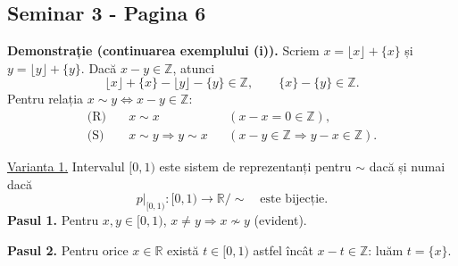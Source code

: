 
\subsection*{Seminar 3 - Pagina 6}
\begingroup
\setlength{\abovedisplayskip}{5pt}
\setlength{\belowdisplayskip}{5pt}
\setlength{\abovedisplayshortskip}{3pt}
\setlength{\belowdisplayshortskip}{3pt}

\noindent\textbf{Demonstrație (continuarea exemplului (i)).}
Scriem $x=\lfloor x\rfloor+\{x\}$ și $y=\lfloor y\rfloor+\{y\}$.
Dacă $x-y\in\mathbb Z$, atunci
\[
 \lfloor x\rfloor+\{x\}-\lfloor y\rfloor-\{y\}\in\mathbb Z,
 \qquad \{x\}-\{y\}\in\mathbb Z.
\]
Pentru relația $x\sim y\iff x-y\in\mathbb Z$:
\[
 \begin{aligned}
 \text{(R)}\quad &x\sim x &&(x-x=0\in\mathbb Z),\\
 \text{(S)}\quad &x\sim y\Longrightarrow y\sim x
     &&(x-y\in\mathbb Z\Longrightarrow y-x\in\mathbb Z).
 \end{aligned}
\]

\noindent\underline{Varianta 1.} Intervalul $[0,1)$ este sistem de
reprezentanți pentru $\sim$ dacă și numai dacă
\[
 p|_{[0,1)}:[0,1)\longrightarrow\mathbb R/{\sim}
 \quad\text{este bijecție}.
\]
\noindent\textbf{Pasul 1.} Pentru $x,y\in[0,1)$,
$x\ne y\Longrightarrow x\not\sim y$ (evident).

\noindent\textbf{Pasul 2.} Pentru orice $x\in\mathbb R$ există
$t\in[0,1)$ astfel încât $x-t\in\mathbb Z$: luăm $t=\{x\}$.


